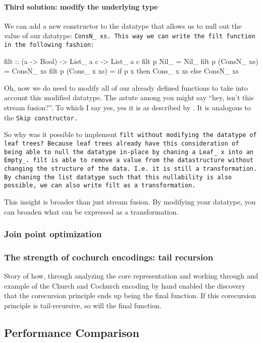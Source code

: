 \paragraph{Third solution: modify the underlying type}
We can add a new constructor to the datatype that allows us to null out the value of our datatype: \tt{ConsN\_ xs}.
This way we can write the \tt{filt} function in the following fashion:
\begin{code}
filt :: (a -> Bool) -> List_ a c -> List_ a c
filt p Nil_ = Nil_
filt p (ConsN_ xs) = ConsN_ xs
filt p (Cons_ x xs) = if p x then Cons_ x xs else ConsN_ xs
\end{code}
Oh, now we do need to modify all of our already defined functions to take into account this modified datatype.
The astute among you might say ``hey, isn't this stream fusion?''.
To which I say yes, yes it is as described by \cite{Coutts2007}.
It is analogous to the \tt{Skip} constructor.

So why was it possible to implement \tt{filt} without modifying the datatype of leaf trees?
Because leaf trees already have this consideration of being able to null the datatype in-place by chaning a \tt{Leaf\_ x} into an \tt{Empty\_}.
\tt{filt} is able to remove a value from the datastructure without changing the structure of the data. I.e. it is still a transformation.
By chaning the list datatype such that this nullability is also possible, we can also write \tt{filt} as a transformation.

This insight is broader than just stream fusion.
By modifying your datatype, you can broaden what can be expressed as a transformation.


\subsubsection{Join point optimization}\label{sec:join}
\subsubsection{The strength of cochurch encodings: tail recursion}\label{sec:tail}
Story of how, through analyzing the core representation and working through and example of the Church and Cochurch encoding by hand enabled the discovery that the corecursion principle ends up being the final function.
If this corecursion principle is tail-recursive, so will the final function.

\subsection{Performance Comparison}



